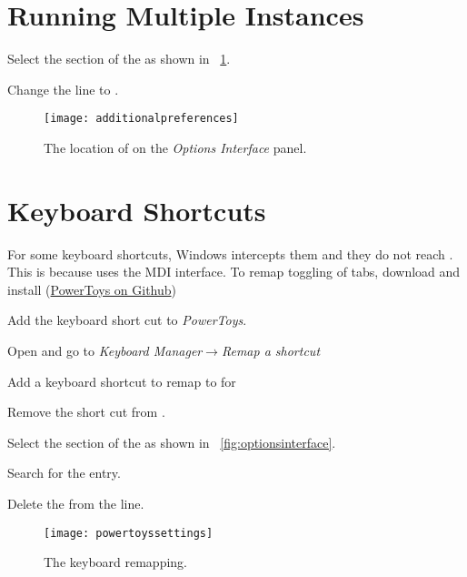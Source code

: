 \section{Running Multiple Instances}
\begin{numberedlist}
	\item Select the  section of the  as shown in \figurename~\ref{fig:additionalpreferences}.
	\item Change the line  to .
\end{numberedlist}
\begin{figure}
	\centering
	\texttt{[image: additionalpreferences]}
	\caption[The location of  on the \textit{Options Interface} panel]{The location of  on the \textit{Options Interface} panel.}
	\label{fig:additionalpreferences}
\end{figure}


\section{Keyboard Shortcuts}
For some keyboard shortcuts, Windows intercepts them and they do not reach \winedt{}.  This is because \winedt{} uses the MDI interface.  To remap toggling of tabs, download and install \powertoys{} (\href{https://github.com/microsoft/PowerToys}{PowerToys on Github})
\begin{outline}
	\item Add the keyboard short cut to \emph{PowerToys}.
	\begin{outline}
		\item Open  and go to \emph{Keyboard Manager}$\rightarrow$\emph{Remap a shortcut}
		\item Add a keyboard shortcut to remap  to  for \winedt{}
	\end{outline}
	\item Remove the short cut from \winedt{}.
	\begin{outline}
		\item Select the  section of the  as shown in \figurename~\ref{fig:optionsinterface}.
		\item Search for the  entry.
		\item Delete the  from the  line.
	\end{outline}
\end{outline}
\begin{figure}
	\centering
	\texttt{[image: powertoyssettings]}
	\caption[The \powertoys{} keyboard remapping]{The \powertoys{} keyboard remapping.}
	\label{fig:powertoyssettings}
\end{figure}


